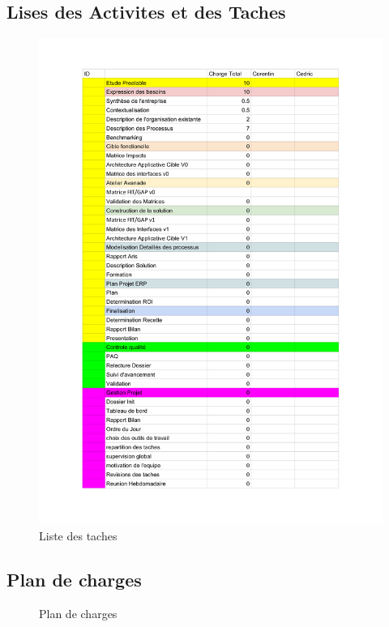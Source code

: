 \documentclass[]{scrartcl}
\begin{document}
\begin{itemize}
\subsection{Lises des Activites et des Taches}
\begin{center}
\begin{figure}[H]
\includegraphics[width=1.15\textwidth]{img/Taches_v0}
\caption{Liste des taches}
\end{figure}
\end{center}
\subsection{Plan de charges}
\begin{center}
\begin{figure}[H]
\caption{Plan de charges}
\end{figure}
\end{center}

\end{itemize}
\end{document}
